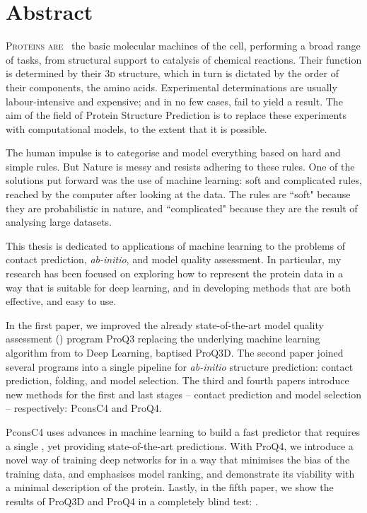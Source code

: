 \chapter*{Abstract}
\lettrine[lines=3, lhang=0.25, nindent=0em, findent=2pt]{\color{Maroon}P}{roteins are\ }
the basic molecular machines of the cell, performing a broad range of tasks, from structural support to catalysis of chemical reactions.
Their function is determined by their \textsc{3d} structure, which in turn is dictated by the order of their components, the amino acids.
Experimental determinations are usually labour-intensive and expensive; and in no few cases, fail to yield a result.
The aim of the field of Protein Structure Prediction is to replace these experiments with computational models, to the extent that it is possible.

The human impulse is to categorise and model everything based on hard and simple rules.
But Nature is messy and resists adhering to these rules.
One of the solutions put forward was the use of machine learning: soft and complicated rules, reached by the computer after looking at the data.
The rules are ``soft" because they are probabilistic in nature, and ``complicated" because they are the result of analysing large datasets.

This thesis is dedicated to applications of machine learning to the problems of contact prediction, \emph{ab-initio}, and model quality assessment.
In particular, my research has been focused on exploring how to represent the protein data in a way that is suitable for deep learning, and in developing methods that are both effective, and easy to use.

In the first paper, we improved the already state-of-the-art model quality assessment (\MQA) program ProQ3 replacing the underlying machine learning algorithm from \SVM{} to Deep Learning, baptised ProQ3D.
The second paper joined several programs into a single pipeline for \emph{ab-initio} structure prediction: contact prediction, folding, and model selection.
The third and fourth papers introduce new methods for the first and last stages  -- contact prediction and model selection -- respectively: PconsC4 and ProQ4.

PconsC4 uses advances in machine learning to build a fast predictor that requires a single \MSA, yet providing state-of-the-art predictions.
With ProQ4, we introduce a novel way of training deep networks for \MQA{} in a way that minimises the bias of the training data, and emphasises model ranking, and demonstrate its viability with a minimal description of the protein.
Lastly, in the fifth paper, we show the results of ProQ3D and ProQ4 in a completely blind test: .

